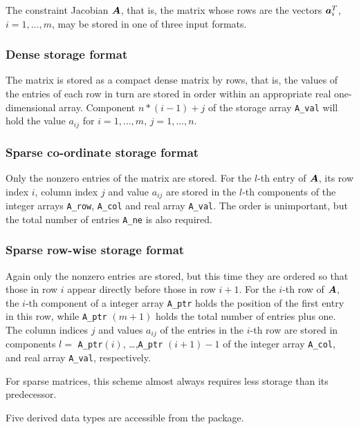 \documentclass{galahad}
\begin{document}

\galmatrix
The constraint Jacobian ${\bm{A}}$, that is, the matrix 
whose rows are the vectors ${\bm{a}}_{i}^{T}$, $i = 1, \ldots , m$, 
may be stored in one of three input formats.

\subsubsection{Dense storage format}\label{dense}
The matrix is stored as a compact 
dense matrix by rows, that is, the values of the entries of each row in turn are
stored in order within an appropriate real one-dimensional array.
Component $n \ast (i-1) + j$ of the storage array {\tt A\_val} will hold the 
value $a_{ij}$ for $i = 1, \ldots , m$, $j = 1, \ldots , n$.

\subsubsection{Sparse co-ordinate storage format}\label{coordinate}
Only the nonzero entries of the matrix are stored. For the 
$l$-th entry of ${\bm{A}}$, its row index $i$, column index $j$ 
and value $a_{ij}$
are stored in the $l$-th components of the integer arrays {\tt A\_row}, 
{\tt A\_col} and real array {\tt A\_val}. 
The order is unimportant, but the total
number of entries {\tt A\_ne} is also required. 

\subsubsection{Sparse row-wise storage format}\label{rowwise}
Again only the nonzero entries are stored, but this time
they are ordered so that those in row $i$ appear directly before those
in row $i+1$. For the $i$-th row of ${\bm{A}}$, the $i$-th component of a 
integer array {\tt A\_ptr} holds the position of the first entry in this row,
while {\tt A\_ptr} $(m+1)$ holds the total number of entries plus one.
The column indices $j$ and values $a_{ij}$ of the entries in the $i$-th row 
are stored in components 
$l =$ {\tt A\_ptr}$(i)$, \ldots ,{\tt A\_ptr} $(i+1)-1$ of the 
integer array {\tt A\_col}, and real array {\tt A\_val}, respectively. 

For sparse matrices, this scheme almost always requires less storage than 
its predecessor.


\galtypes
Five derived data types are accessible from the package.
\end{document}
